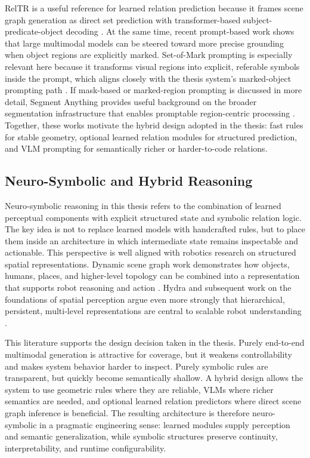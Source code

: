 \documentclass[
  digital,     %
  oneside,     %
  nosansbold,  %
  nocolorbold, %
  lof,         %
  lot,         %
]{fithesis4}
\begin{document}
RelTR is a useful reference for learned relation prediction because it frames scene graph generation as direct set prediction with transformer-based subject-predicate-object decoding \cite{cong_reltr_2023}. At the same time, recent prompt-based work shows that large multimodal models can be steered toward more precise grounding when object regions are explicitly marked. Set-of-Mark prompting is especially relevant here because it transforms visual regions into explicit, referable symbols inside the prompt, which aligns closely with the thesis system's marked-object prompting path \cite{yang_set-of-mark_2023}. If mask-based or marked-region prompting is discussed in more detail, Segment Anything provides useful background on the broader segmentation infrastructure that enables promptable region-centric processing \cite{kirillov_segment_2023}. Together, these works motivate the hybrid design adopted in the thesis: fast rules for stable geometry, optional learned relation modules for structured prediction, and VLM prompting for semantically richer or harder-to-code relations.

\subsection{Neuro-Symbolic and Hybrid Reasoning}
Neuro-symbolic reasoning in this thesis refers to the combination of learned perceptual components with explicit structured state and symbolic relation logic. The key idea is not to replace learned models with handcrafted rules, but to place them inside an architecture in which intermediate state remains inspectable and actionable. This perspective is well aligned with robotics research on structured spatial representations. Dynamic scene graph work demonstrates how objects, humans, places, and higher-level topology can be combined into a representation that supports robot reasoning and action \cite{rosinol_3d_2020}. Hydra and subsequent work on the foundations of spatial perception argue even more strongly that hierarchical, persistent, multi-level representations are central to scalable robot understanding \cite{hughes_hydra_2022, hughes_foundations_2024, mascaro_scene_2025}.

This literature supports the design decision taken in the thesis. Purely end-to-end multimodal generation is attractive for coverage, but it weakens controllability and makes system behavior harder to inspect. Purely symbolic rules are transparent, but quickly become semantically shallow. A hybrid design allows the system to use geometric rules where they are reliable, VLMs where richer semantics are needed, and optional learned relation predictors where direct scene graph inference is beneficial. The resulting architecture is therefore neuro-symbolic in a pragmatic engineering sense: learned modules supply perception and semantic generalization, while symbolic structures preserve continuity, interpretability, and runtime configurability.
\end{document}
